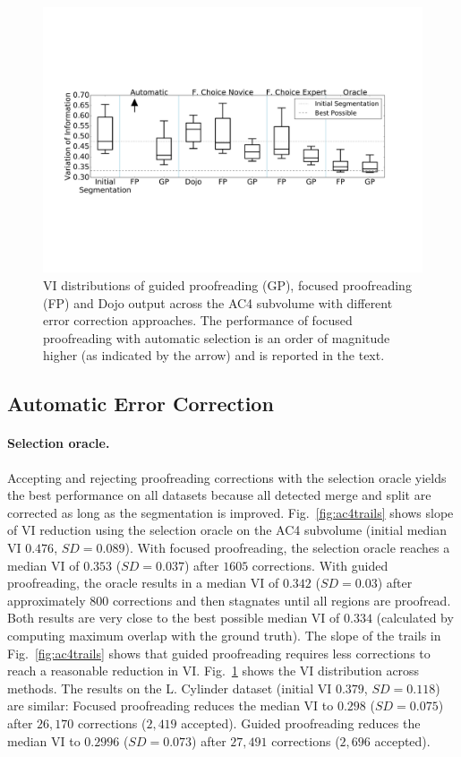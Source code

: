 \begin{figure}[t]
\begin{center}
\includegraphics[width=\linewidth]{gfx/ac4boxplot.pdf}
\end{center}
  \vspace{-4mm}
   \caption{VI distributions of guided proofreading (GP), focused proofreading (FP) and Dojo output across the AC4 subvolume with different error correction approaches. The performance of focused proofreading with automatic selection is an order of magnitude higher (as indicated by the arrow) and is reported in the text.}
\label{fig:ac4boxplot}
\end{figure}
\subsection{Automatic Error Correction}

\paragraph{Selection oracle.} Accepting and rejecting proofreading corrections with the selection oracle yields the best performance on all datasets because all detected merge and split are corrected as long as the segmentation is improved. Fig.~\ref{fig:ac4trails} shows slope of VI reduction using the selection oracle on the AC4 subvolume (initial median VI $0.476$, $SD=0.089$). With focused proofreading, the selection oracle reaches a median VI of $0.353$ ($SD=0.037$) after $1605$ corrections. With guided proofreading, the oracle results in a median VI of $0.342$ ($SD=0.03$) after approximately $800$ corrections and then stagnates until all regions are proofread. Both results are very close to the best possible median VI of $0.334$ (calculated by computing maximum overlap with the ground truth). The slope of the trails in Fig.~\ref{fig:ac4trails} shows that guided proofreading requires less corrections to reach a reasonable reduction in VI. Fig.~\ref{fig:ac4boxplot} shows the VI distribution across methods.
The results on the L. Cylinder dataset (initial VI $0.379$, $SD=0.118$) are similar: Focused proofreading reduces the median VI to $0.298$ ($SD=0.075$) after $26,170$ corrections ($2,419$ accepted). Guided proofreading reduces the median VI to $0.2996$ ($SD=0.073$) after $27,491$ corrections ($2,696$ accepted).

